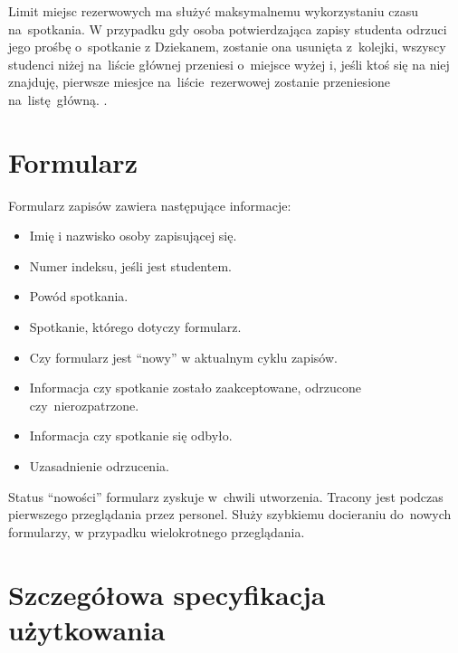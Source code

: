 \documentclass[licencjacka]{pracamgr}
\begin{document}
Limit miejsc rezerwowych ma służyć maksymalnemu wykorzystaniu czasu na~spotkania. W przypadku gdy osoba potwierdzająca zapisy studenta odrzuci jego prośbę o~spotkanie z Dziekanem, zostanie ona usunięta z~kolejki, wszyscy studenci niżej na~liście głównej przeniesi o~miejsce wyżej i, jeśli ktoś się na niej znajduję, pierwsze miesjce na~liście~rezerwowej zostanie przeniesione na~listę~główną. . 


\section{Formularz}
Formularz zapisów zawiera następujące informacje:

\begin{itemize}
\setlength\itemsep{0,05em}
    \item Imię i nazwisko osoby zapisującej się.
    \item Numer indeksu, jeśli jest studentem.
    \item Powód spotkania.
    \item Spotkanie, którego dotyczy formularz.
    \item Czy formularz jest “nowy” w aktualnym cyklu zapisów.
    \item Informacja czy spotkanie zostało zaakceptowane, odrzucone czy~nierozpatrzone.
    \item Informacja czy spotkanie się odbyło.
    \item Uzasadnienie odrzucenia.
\end{itemize}
Status “nowości” formularz zyskuje w~chwili utworzenia. Tracony jest podczas pierwszego przeglądania przez personel. Służy szybkiemu docieraniu do~nowych formularzy, w przypadku wielokrotnego przeglądania.

\section{Szczegółowa specyfikacja użytkowania}
\end{document}
